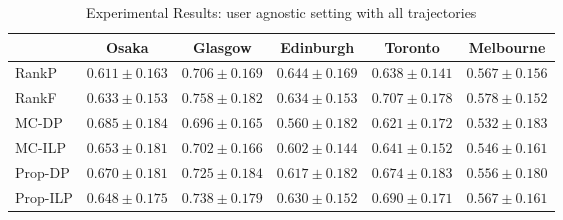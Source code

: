 

\begin{table*}
\centering
\caption{Experimental Results: user agnostic setting with all trajectories}
\begin{tabular}{l|ccccc} \hline
 & Osaka & Glasgow & Edinburgh & Toronto & Melbourne \\ \hline
RankP & $0.611\pm0.163$ & $0.706\pm0.169$ & $\mathbf{0.644\pm0.169}$ & $0.638\pm0.141$ & $0.567\pm0.156$ \\
RankF & $0.633\pm0.153$ & $\mathbf{0.758\pm0.182}$ & $0.634\pm0.153$ & $\mathbf{0.707\pm0.178}$ & $\mathbf{0.578\pm0.152}$ \\
MC-DP & $\mathbf{0.685\pm0.184}$ & $0.696\pm0.165$ & $0.560\pm0.182$ & $0.621\pm0.172$ & $0.532\pm0.183$ \\
MC-ILP & $0.653\pm0.181$ & $0.702\pm0.166$ & $0.602\pm0.144$ & $0.641\pm0.152$ & $0.546\pm0.161$ \\
Prop-DP & $0.670\pm0.181$ & $0.725\pm0.184$ & $0.617\pm0.182$ & $0.674\pm0.183$ & $0.556\pm0.180$ \\
Prop-ILP & $0.648\pm0.175$ & $0.738\pm0.179$ & $0.630\pm0.152$ & $0.690\pm0.171$ & $0.567\pm0.161$ \\
\hline
\end{tabular}
\end{table*}

